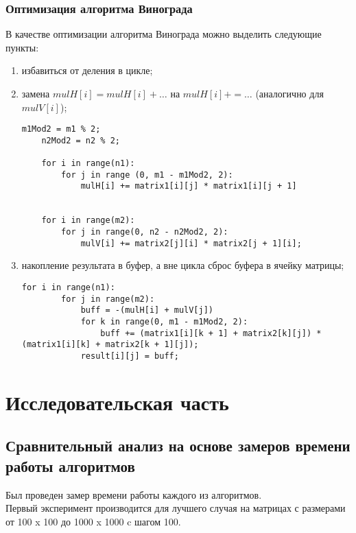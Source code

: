 \documentclass[12pt]{report}
\begin{document}
\subsection{Оптимизация алгоритма Винограда}
В качестве оптимизации алгоритма Винограда можно выделить следующие пункты:
\begin{enumerate}
	\item избавиться от деления в цикле;
	\item замена $mulH[i] = mulH[i] + …$ на $mulH[i] += …$ (аналогично для $mulV[i]$);
	\begin{lstlisting}[label=some-code,caption=Оптимизации алгоритма Винограда №1 и №2]
	m1Mod2 = m1 % 2;
	n2Mod2 = n2 % 2;
	
	for i in range(n1):
		for j in range (0, m1 - m1Mod2, 2):
			mulH[i] += matrix1[i][j] * matrix1[i][j + 1]
	
	
	for i in range(m2):
		for j in range(0, n2 - n2Mod2, 2):
			mulV[i] += matrix2[j][i] * matrix2[j + 1][i];
\end{lstlisting}

	\item накопление результата в буфер, а вне цикла сброс буфера в ячейку матрицы;
	\begin{lstlisting}[label=some-code,caption=Оптимизации алгоритма Винограда №3]
	for i in range(n1):
		for j in range(m2):
			buff = -(mulH[i] + mulV[j])
			for k in range(0, m1 - m1Mod2, 2):
				buff += (matrix1[i][k + 1] + matrix2[k][j]) * (matrix1[i][k] + matrix2[k + 1][j]);
			result[i][j] = buff;
\end{lstlisting}

\end{enumerate}




\chapter{Исследовательская часть}

\section{Сравнительный анализ на основе замеров времени работы алгоритмов}

Был проведен замер времени работы каждого из алгоритмов.\\
Первый эксперимент производится для лучшего случая на матрицах с размерами от 100 x 100 до 1000 x 1000 c шагом 100. \\
\end{document}
